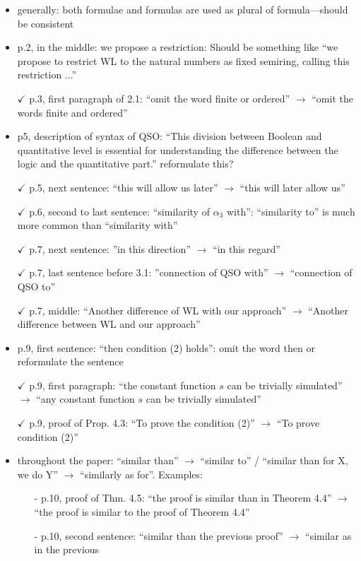 \begin{itemize}
	\setlength\itemsep{0.5em}
	\item generally: both formulae and formulas are used as plural of formula---should be consistent
	\item p.2, in the middle: we propose a restriction: Should be something like ``we propose to restrict
	WL to the natural numbers as fixed semiring, calling this restriction ...''
	\item[$\checkmark$] p.3, first paragraph of 2.1: ``omit the word finite or ordered'' $\to$ ``omit the words finite and
	ordered''
	\item p5, description of syntax of QSO: ``This division between Boolean and quantitative level
	is essential for understanding the difference between the logic and the quantitative part.''
	reformulate this?
	\item[$\checkmark$] p.5, next sentence: ``this will allow us later'' $\to$ ``this will later allow us''
	\item[$\checkmark$] p.6, second to last sentence: ``similarity of $\alpha_3$ with'': ``similarity to'' is much more common
	than ``similarity with''
	\item[$\checkmark$] p.7, next sentence: ''in this direction'' $\to$ ``in this regard''
	\item[$\checkmark$] p.7, last sentence before 3.1: ''connection of QSO with'' $\to$ ``connection of QSO to''
	\item[$\checkmark$] p.7, middle: ``Another difference of WL with our approach'' $\to$ ``Another difference between
	WL and our approach''
	\item p.9, first sentence: ``then condition (2) holds'': omit the word then or reformulate the sentence
	\item[$\checkmark$] p.9, first paragraph: ``the constant function $s$ can be trivially simulated'' $\to$ ``any constant
	function $s$ can be trivially simulated''
	\item[$\checkmark$] p.9, proof of Prop. 4.3: ``To prove the condition (2)'' $\to$ ``To prove condition (2)''
	\item throughout the paper: ``similar than'' $\to$ ``similar to'' / ``similar than for X, we do Y'' $\to$
	``similarly as for''. Examples:
	\begin{itemize}
	\item[-] p.10, proof of Thm. 4.5: ``the proof is similar than in Theorem 4.4'' $\to$ ``the proof is
	similar to the proof of Theorem 4.4''	
	\item[-] p.10, second sentence: ``similar than the previous proof'' $\to$ ``similar as in the previous

\end{itemize}
\end{itemize}
